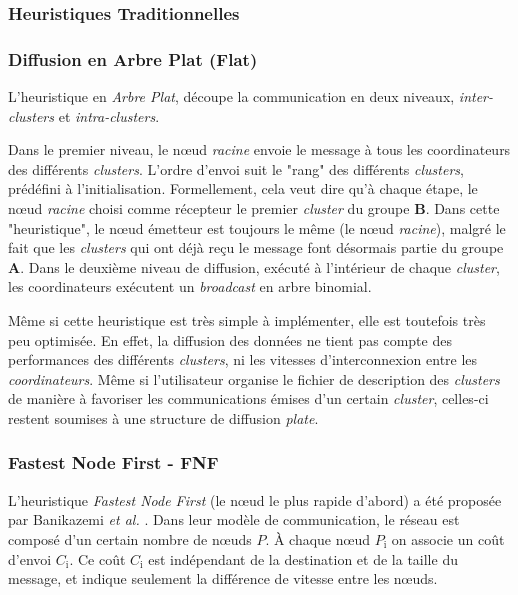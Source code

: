 \subsubsection{Heuristiques Traditionnelles}

\subsubsection*{Diffusion en Arbre Plat (Flat)}

L'heuristique en \emph{Arbre Plat}, découpe la communication en deux niveaux, \emph{inter-clusters}
et \emph{intra-clusters}. 

Dans le premier niveau, le n{\oe}ud \emph{racine} envoie le message
à tous les coordinateurs des différents \textit{clusters}. L'ordre d'envoi
suit le "rang" des différents \textit{clusters}, prédéfini à l'initialisation.
Formellement, cela veut dire qu'à chaque étape, le n{\oe}ud \emph{racine}
choisi comme récepteur le premier  \textit{cluster} du groupe \textbf{B}. Dans
cette "heuristique", le n{\oe}ud émetteur est toujours
le même (le n{\oe}ud \emph{racine}), malgré le fait que les  \textit{clusters}
qui ont déjà reçu le message font désormais partie du groupe \textbf{A}.
Dans le deuxième niveau de diffusion, exécuté à l'intérieur de chaque
 \textit{cluster}, les coordinateurs exécutent un \emph{broadcast} en arbre binomial.

Même si cette heuristique est très simple à implémenter, elle est toutefois
très peu optimisée. En effet, la diffusion des données ne tient pas
compte des performances des différents  \textit{clusters}, ni les vitesses d'interconnexion
entre les \emph{coordinateurs}. Même si l'utilisateur organise le
fichier de description des  \textit{clusters} de manière à favoriser les communications
émises d'un certain  \textit{cluster}, celles-ci restent soumises à une structure
de diffusion \emph{plate}. 


\subsubsection*{Fastest Node First - FNF}

L'heuristique \emph{Fastest Node First} (le n{\oe}ud le plus rapide d'abord)
a été proposée par Banikazemi \emph{et al.} \cite{Banikazemi98}.
Dans leur modèle de communication, le réseau est composé d'un certain
nombre de n{\oe}uds \emph{$P$}. À chaque n{\oe}ud \emph{$P_{\textrm{i}}$}
on associe un coût d'envoi \emph{$C_{\textrm{i}}$}. Ce coût \emph{$C_{\textrm{i}}$}
est indépendant de la destination et de la taille du message, et indique
seulement la différence de vitesse entre les n{\oe}uds.

